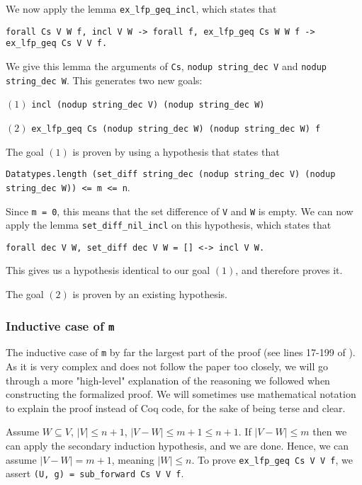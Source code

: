 We now apply the lemma \lstinline{ex_lfp_geq_incl}, which states that

\tabto{2em}
\lstinline{forall Cs V W f, incl V W -> forall f, ex_lfp_geq Cs W W f -> ex_lfp_geq Cs V V f.}

We give this lemma the arguments of \lstinline{Cs}, \lstinline{nodup string_dec V} and \lstinline{nodup string_dec W}.
This generates two new goals:

$(1)$
\tabto{2em}
\lstinline{incl (nodup string_dec V) (nodup string_dec W)}

$(2)$
\tabto{2em}
\lstinline{ex_lfp_geq Cs (nodup string_dec W) (nodup string_dec W) f}

The goal $(1)$ is proven by using a hypothesis that states that

\tabto{2em}
\lstinline{Datatypes.length (set_diff string_dec (nodup string_dec V) (nodup string_dec W)) <= m <= n}.

Since \lstinline{m = 0}, this means that
the set difference of \lstinline{V} and \lstinline{W} is empty.
We can now apply the lemma \lstinline{set_diff_nil_incl} on this hypothesis, which states that

\tabto{2em}
\lstinline{forall dec V W, set_diff dec V W = [] <-> incl V W.}

This gives us a hypothesis identical to our goal $(1)$, and therefore proves it.

The goal $(2)$ is proven by an existing hypothesis.

\subsubsection{Inductive case of \lstinline{m}}
\label{sssec:inductive_case_m}

The inductive case of \lstinline{m} by far the largest part of the proof (see lines 17-199 of ).
As it is very complex and does not follow the paper too closely,
we will go through a more "high-level" explanation of the reasoning
we followed when constructing the formalized proof.
We will sometimes use mathematical notation to explain the proof instead of Coq code,
for the sake of being terse and clear.

Assume $W \subseteq V$, $\lvert V \rvert \leq n + 1$, $\lvert V - W \rvert \leq m + 1 \leq n + 1$.
If $\lvert V - W \rvert \leq m$ then we can apply the secondary induction hypothesis, and we are done.
Hence, we can assume $\lvert V - W \rvert = m + 1$, meaning $\lvert W \rvert \leq n$.
To prove \lstinline{ex_lfp_geq Cs V V f}, we assert \lstinline{(U, g) = sub_forward Cs V V f}.


